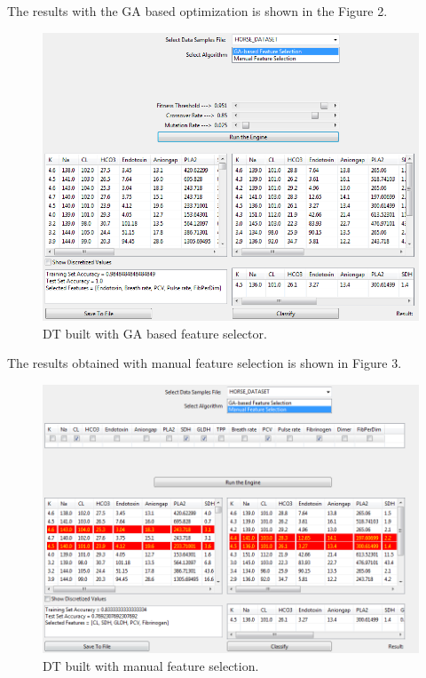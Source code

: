 \documentclass[conference]{IEEEtran}
\begin{document}
The results with the GA based optimization is shown in the Figure 2.
\begin{figure}[h!]
  
  \centering
    \includegraphics[scale=0.4]{ga_algo_stats.png}
\caption{DT built with GA based feature selector.}
\end{figure}

The results obtained with manual feature selection is shown in Figure 3.
\begin{figure}[h!]
  
  \centering
    \includegraphics[scale=0.4]{manual_sel_stats.png}
\caption{DT built with manual feature selection.}
\end{figure}
\end{document}
